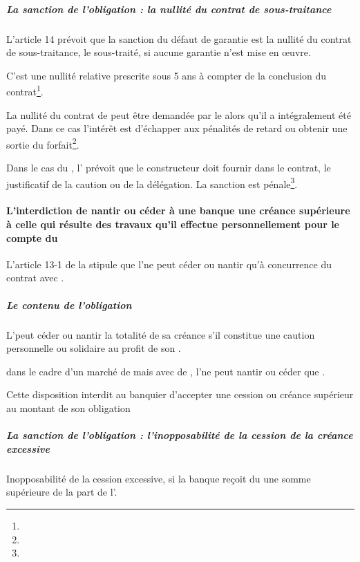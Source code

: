 				\subparagraph{La sanction de l'obligation : la nullité du contrat de sous-traitance}

					L'article 14 prévoit que la sanction du défaut de garantie est la nullité du contrat de sous-traitance, le sous-traité, si aucune garantie n’est mise en œuvre.


					C’est une nullité relative prescrite sous 5 ans à compter de la conclusion du contrat\footnote{}.

					La nullité du contrat de \ST* peut être demandée par le \ST alors qu’il a intégralement été payé. Dans ce cas l’intérêt est d’échapper aux pénalités de retard ou obtenir une sortie du forfait\footnote{}.

\aCompleter

					Dans le cas du \CCMI, l' prévoit que le constructeur doit fournir dans le contrat, le justificatif de la caution ou de la délégation. La sanction est pénale\footnote{}.


			\paragraph{L'interdiction de nantir ou céder à une banque une créance supérieure à celle qui résulte des travaux qu'il effectue personnellement pour le compte du \Mo}

				L'article 13-1 de la \loiST stipule que l’\ep ne peut céder ou nantir qu’à concurrence du contrat avec \Mo.

				\subparagraph{Le contenu de l'obligation}

					L'\ep peut céder ou nantir la totalité de sa créance s’il constitue une caution personnelle ou solidaire au profit de son \ST.

					\begin{exemple}
						dans le cadre d'un marché de  mais avec  de \ST*, l'\ep ne peut nantir ou céder que .
					\end{exemple}

					Cette disposition interdit au banquier d’accepter une cession ou créance supérieur au montant de son obligation



				\subparagraph{La sanction de l'obligation : l'inopposabilité de la cession de la créance excessive}

					Inopposabilité de la cession excessive, si la banque reçoit du \MO une somme supérieure de la part de l’\ep.\aVerifier

